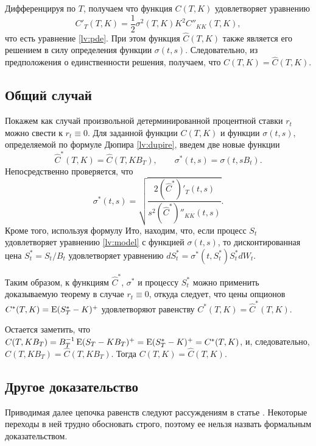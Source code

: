 Дифференцируя по $T$, получаем что функция $C(T,K)$ удовлетворяет уравнению
\[
C'_T(T,K) = \frac12 \sigma^2(T,K)K^2 C''_{KK}(T,K),
\]
что есть уравнение \eqref{lv:pde}.
При этом функция $\hat C(T,K)$ также является его решением в силу определения функции $\sigma(t,s)$.
Следовательно, из предположения о единственности решения, получаем, что $C(T,K) = \hat C(T,K)$.


\subsection{Общий случай}
\label{lv:ss:general-case}
Покажем как случай произвольной детерминированной процентной ставки $r_t$ можно свести к $r_t\equiv 0$.
Для заданной функции $C(T,K)$ и функции $\sigma(t,s)$, определяемой по формуле Дюпира \eqref{lv:dupire}, введем две новые функции
\[
\hat C^*(T,K) = \hat C(T,KB_T), \qquad 
\sigma^*(t,s) = \sigma(t, sB_t).
\]
Непосредственно проверяется, что
\[
\sigma^*(t,s) = \sqrt{\frac{2(\hat C^*)'_T(t,s)}{s^2(\hat C^*)''_{KK}(t,s)}}.
\]
Кроме того, используя формулу Ито, находим, что, если процесс $S_t$ удовлетворяет уравнению \eqref{lv:model} с функцией $\sigma(t,s)$, то дисконтированная цена $S_t^* = S_t/B_t$ удовлетворяет уравнению $d S_t^* = \sigma^*(t,S_t^*) S_t^* d W_t$.

Таким образом, к функциям $\hat C^*$, $\sigma^*$ и процессу $S_t^*$ можно применить доказываемую теорему в случае $r_t\equiv 0$, откуда следует, что цены опционов $C^*(T,K) = \operatorname{E}(S_T^*-K)^+$  удовлетворяют равенству $C^*(T,K)=\hat C^*(T,K)$. 

Остается заметить, что $C(T,KB_T) = B_T^{-1} \operatorname{E}(S_T-KB_T)^+ = \operatorname{E}(S_T^* - K)^+ = C^*(T,K)$, и, следовательно, $C(T,KB_T) = \hat C(T,KB_T)$.
Тогда $C(T,K) = \hat C(T,K)$.


\subsection{Другое доказательство}
\label{lv:s:dupire-proof}

Приводимая далее цепочка равенств следуют рассуждениям в статье \cite{Dupire94}.
Некоторые переходы в ней трудно обосновать строго, поэтому ее нельзя назвать формальным доказательством.

